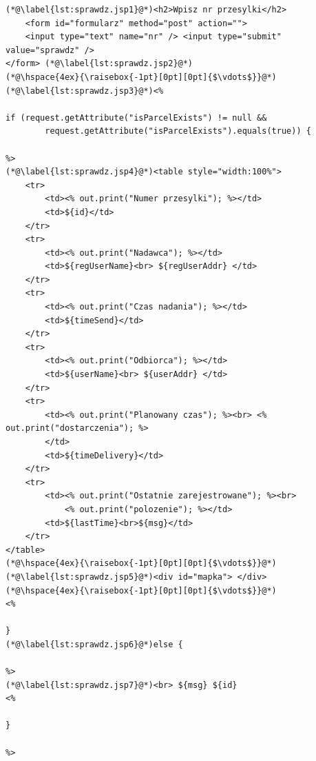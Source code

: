 \documentclass[eng,printmode,oneside]{mgr}
\begin{document}
\begin{lstlisting}[caption=Ciało pliku JavaServlet Pages -
sprawdz.jsp,label=lst:Sprawdz.jsp] 
(*@\label{lst:sprawdz.jsp1}@*)<h2>Wpisz nr przesylki</h2> 
	<form id="formularz" method="post" action=""> 
	<input type="text" name="nr" /> <input type="submit" value="sprawdz" />
</form> (*@\label{lst:sprawdz.jsp2}@*)
(*@\hspace{4ex}{\raisebox{-1pt}[0pt][0pt]{$\vdots$}}@*)
(*@\label{lst:sprawdz.jsp3}@*)<%

if (request.getAttribute("isParcelExists") != null &&
		request.getAttribute("isParcelExists").equals(true)) {
		
%>
(*@\label{lst:sprawdz.jsp4}@*)<table style="width:100%">
	<tr>
		<td><% out.print("Numer przesylki"); %></td>
		<td>${id}</td>
	</tr>
	<tr>
		<td><% out.print("Nadawca"); %></td>
		<td>${regUserName}<br> ${regUserAddr} </td>
	</tr>
	<tr>
		<td><% out.print("Czas nadania"); %></td>
		<td>${timeSend}</td>
	</tr>
	<tr>
		<td><% out.print("Odbiorca"); %></td>
		<td>${userName}<br> ${userAddr} </td>
	</tr>
	<tr>
		<td><% out.print("Planowany czas"); %><br> <% out.print("dostarczenia"); %>
		</td>
		<td>${timeDelivery}</td>
	</tr>
	<tr>
		<td><% out.print("Ostatnie zarejestrowane"); %><br>
			<% out.print("polozenie"); %></td>
		<td>${lastTime}<br>${msg}</td>
	</tr>
</table>
(*@\hspace{4ex}{\raisebox{-1pt}[0pt][0pt]{$\vdots$}}@*)
(*@\label{lst:sprawdz.jsp5}@*)<div id="mapka"> </div>
(*@\hspace{4ex}{\raisebox{-1pt}[0pt][0pt]{$\vdots$}}@*)
<%

}
(*@\label{lst:sprawdz.jsp6}@*)else {

%>
(*@\label{lst:sprawdz.jsp7}@*)<br> ${msg} ${id}
<% 

}

%>
\end{lstlisting}
\end{document}
